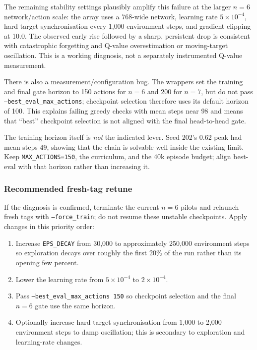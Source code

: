 \documentclass[11pt]{article}
\newcommand{\code}[1]{\texttt{#1}}
\begin{document}
The remaining stability settings plausibly amplify this failure at the larger
$n=6$ network/action scale: the array uses a 768-wide network, learning rate
$5\times10^{-4}$, hard target synchronisation every 1{,}000 environment steps,
and gradient clipping at 10.0. The observed early rise followed by a sharp,
persistent drop is consistent with catastrophic forgetting and Q-value
overestimation or moving-target oscillation. This is a working diagnosis, not a
separately instrumented Q-value measurement.

There is also a measurement/configuration bug. The wrappers set the training and
final gate horizon to 150 actions for $n=6$ and 200 for $n=7$, but do not pass
\code{--best\_eval\_max\_actions}; checkpoint selection therefore uses its
default horizon of 100. This explains failing greedy checks with mean steps near
98 and means that ``best'' checkpoint selection is not aligned with the final
head-to-head gate.

The training horizon itself is \emph{not} the indicated lever. Seed 202's 0.62
peak had mean steps 49, showing that the chain is solvable well inside the
existing limit. Keep \code{MAX\_ACTIONS=150}, the curriculum, and the 40k episode
budget; align best-eval with that horizon rather than increasing it.

\subsubsection*{Recommended fresh-tag retune}

If the diagnosis is confirmed, terminate the current $n=6$ pilots and relaunch
fresh tags with \code{--force\_train}; do not resume these unstable checkpoints.
Apply changes in this priority order:

\begin{enumerate}
  \item Increase \code{EPS\_DECAY} from 30{,}000 to approximately 250{,}000
  environment steps so exploration decays over roughly the first 20\% of the
  run rather than its opening few percent.
  \item Lower the learning rate from $5\times10^{-4}$ to $2\times10^{-4}$.
  \item Pass \code{--best\_eval\_max\_actions 150} so checkpoint selection and
  the final $n=6$ gate use the same horizon.
  \item Optionally increase hard target synchronisation from 1{,}000 to 2{,}000
  environment steps to damp oscillation; this is secondary to exploration and
  learning-rate changes.
\end{enumerate}
\end{document}
